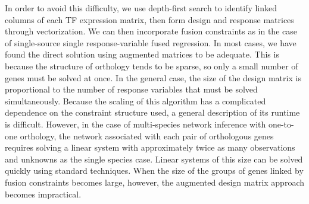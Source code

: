 \documentclass[11pt]{article}
\begin{document}
In order to avoid this difficulty, we use depth-first search to identify linked columns of each TF expression matrix, then form design and response matrices through vectorization. We can then incorporate fusion constraints as in the case of single-source single response-variable fused regression. In most cases, we have found the direct solution using augmented matrices to be adequate. This is because the structure of orthology tends to be sparse, so only a small number of genes must be solved at once. In the general case, the size of the design matrix is proportional to the number of response variables that must be solved simultaneously. Because the scaling of this algorithm has a complicated dependence on the constraint structure used, a general description of its runtime is difficult. However, in the case of multi-species network inference with one-to-one orthology, the network associated with each pair of orthologous genes requires solving a linear system with approximately twice as many observations and unknowns as the single species case. Linear systems of this size can be solved quickly using standard techniques. When the size of the groups of genes linked by fusion constraints becomes large, however, the augmented design matrix approach becomes impractical.


\end{document}
